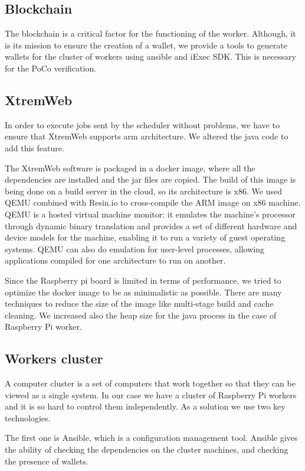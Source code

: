     \subsection{Blockchain}
    The blockchain is a critical factor for the functioning of the worker. Although, it is its mission
    to ensure the creation of a wallet, we provide a tools to generate wallets for the cluster of workers
    using ansible and iExec SDK. This is necessary for the PoCo verification.

    \subsection{XtremWeb}
    In order to execute jobs sent by the scheduler without problems, we have to ensure that XtremWeb supports
    arm architecture. We altered the java code to add this feature.

    The XtremWeb software is packaged in a docker image, where all the dependencies are installed and the jar
    files are copied. The build of this image is being done on a build server in the cloud, so its architecture
    is x86. We used QEMU combined with Resin.io to cross-compile the ARM image on x86 machine.
    QEMU is a hosted virtual machine monitor: it emulates the machine's processor through dynamic binary
    translation and provides a set of different hardware and device models for the machine, enabling it to
    run a variety of guest operating systems. QEMU can also do emulation for user-level processes, allowing
    applications compiled for one architecture to run on another.

    Since the Raspberry pi board is limited in terms of performance, we tried to optimize the docker image to be
    as minimalistic as possible. There are many techniques to reduce the size of the image like multi-stage
    build and cache cleaning. We increased also the heap size for the java process in the case of
    Raspberry Pi worker.

    \subsection{Workers cluster}
    A computer cluster is a set of computers that work together so that they can be viewed as a single system.
    In our case we have a cluster of Raspberry Pi workers and it is so hard to control them independently.
    As a solution we use two key technologies.
    
    The first one is Ansible, which is a configuration management tool.
    Ansible gives the ability of checking the dependencies on the cluster machines, and checking the presence
    of wallets.

